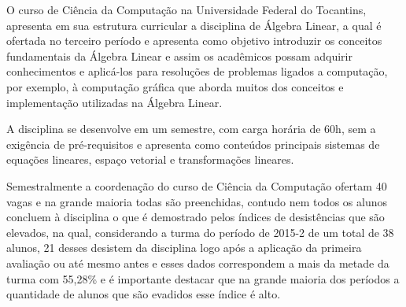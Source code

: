 \noindent O curso de Ciência da Computação na Universidade Federal do Tocantins, apresenta em sua estrutura curricular a disciplina de Álgebra Linear, a qual é ofertada no terceiro período e apresenta como objetivo introduzir os conceitos fundamentais da Álgebra Linear e assim os acadêmicos possam adquirir conhecimentos e aplicá-los para resoluções de problemas ligados a computação, por exemplo, à computação gráfica que aborda muitos dos conceitos e implementação utilizadas na Álgebra Linear.

A disciplina se desenvolve em um semestre, com carga horária de 60h, sem a exigência de pré-requisitos e apresenta como conteúdos principais sistemas de equações lineares, espaço vetorial e transformações lineares.

Semestralmente a coordenação do curso de Ciência da Computação ofertam 40 vagas e na grande maioria todas são preenchidas, contudo nem todos os alunos concluem à disciplina o que é demostrado pelos índices de desistências que são elevados, na qual, considerando a turma do período de 2015-2 de um total de 38 alunos, 21 desses desistem da disciplina logo após a aplicação da primeira avaliação ou até mesmo antes e esses dados correspondem a mais da metade da turma com 55,28\% e é importante destacar que na grande maioria dos períodos a quantidade de alunos que são evadidos esse índice é alto.